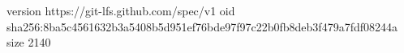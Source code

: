 version https://git-lfs.github.com/spec/v1
oid sha256:8ba5c4561632b3a5408b5d951ef76bde97f97c22b0fb8deb3f479a7fdf08244a
size 2140
